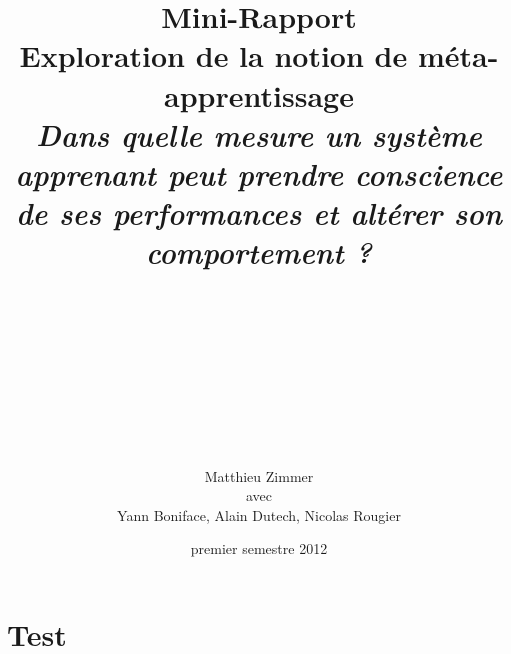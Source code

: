 \documentclass[a4paper,12pt, twoside]{article}
\title{
  \textbf{Mini-Rapport}
  \\[1cm]
  Exploration de la notion de méta-apprentissage
  \\[1.3cm]
  \textit{
  Dans quelle mesure un système apprenant peut prendre conscience de ses performances
  et altérer son comportement ?}
}
\author{
  \\
  \\
  \\
  \\
  \\
  \\
  \\
  \\
  \\
  Matthieu Zimmer \\
  avec \\
  Yann Boniface, Alain Dutech, Nicolas Rougier }
\date{premier semestre 2012}
\begin{document}
\maketitle





\newpage
\section{Test}




\end{document}
